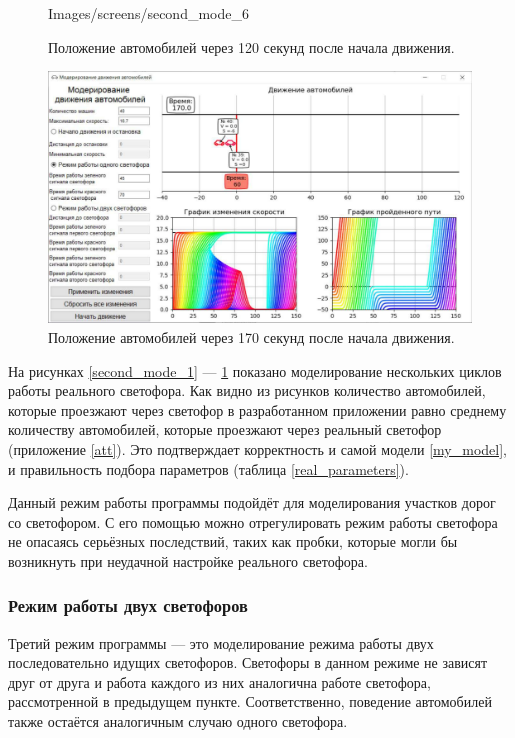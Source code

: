 \documentclass[12pt, a4paper]{extarticle}
\numberwithin{equation}{section}
\numberwithin{figure}{section}
\begin{document}
\begin{figure}[h!]
\begin{center}
\begin{minipage}[h]{0.48\linewidth}
			{Images/screens/second_mode_6}
			\caption{Положение автомобилей через 120 секунд после начала движения.}
			\label{second_mode_6}
		\end{minipage}
		\hfill
		\begin{minipage}[h]{0.48\linewidth}
			\includegraphics[width=1\linewidth]
			{Images/screens/second_mode_9}
			\caption{Положение автомобилей через 170 секунд после начала движения.} 
			\label{second_mode_9}
		\end{minipage}
	\end{center}
\end{figure}

На рисунках \ref{second_mode_1} --- \ref{second_mode_9} показано моделирование нескольких циклов работы реального светофора. Как видно из рисунков количество автомобилей, которые проезжают через светофор в разработанном приложении равно среднему количеству автомобилей, которые проезжают через реальный светофор (приложение \ref{att}). Это подтверждает корректность и самой модели \eqref{my_model}, и правильность подбора параметров (таблица \ref{real_parameters}). 

Данный режим работы программы подойдёт для моделирования участков дорог со светофором. С его помощью можно отрегулировать режим работы светофора не опасаясь серьёзных последствий, таких как пробки, которые могли бы возникнуть при неудачной настройке реального светофора.  

\subsubsection{Режим работы двух светофоров}

Третий режим программы --- это моделирование режима работы двух последовательно идущих светофоров. Светофоры в данном режиме не зависят друг от друга и работа каждого из них аналогична работе светофора, рассмотренной в предыдущем пункте. Соответственно, поведение автомобилей также остаётся аналогичным случаю одного светофора.
\end{document}
